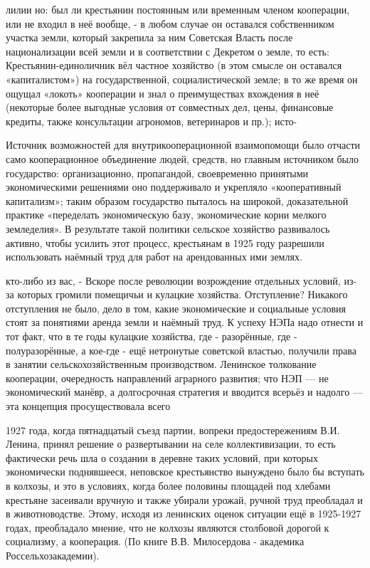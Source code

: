 \label{100-1}
лилии но: был ли крестьянин постоянным или временным членом кооперации, или не входил в неё вообще, - в любом случае он оставался собственником участка земли, который закрепила за ним Советская Власть после национализации всей земли и в соответствии с Декретом о земле, то есть: Крестьянин-единоличник вёл частное хозяйство (в этом смысле он оставался «капиталистом») на государственной, социалистической земле; в то же время он ощущал «локоть» кооперации и знал о преимуществах вхождения в неё (некоторые более выгодные условия от совместных дел, цены, финансовые кредиты, также консультации агрономов, ветеринаров и пр.); исто-

\label{101-1}
Источник возможностей для внутрикооперационной взаимопомощи было отчасти само кооперационное объединение людей, средств, но главным источником было государство: организационно, пропагандой, своевременно принятыми экономическими решениями оно поддерживало и укрепляло «кооперативный капитализм»; таким образом государство пыталось на широкой, доказательной практике «переделать экономическую базу, экономические корни мелкого земледелия». В результате такой политики сельское хозяйство развивалось активно, чтобы усилить этот процесс, крестьянам в 1925 году разрешили использовать наёмный труд для работ на арендованных ими землях.

\label{102-1}
кто-либо из вас, - Вскоре после революции возрождение отдельных условий, из-за которых громили помещичьи и кулацкие хозяйства. Отступление? Никакого отступления не было, дело в том, какие экономические и социальные условия стоят за понятиями аренда земли и наёмный труд. К успеху НЭПа надо отнести и тот факт, что в те годы кулацкие хозяйства, где - разорённые, где - полуразорённые, а кое-где - ещё нетронутые советской властью, получили права в занятии сельскохозяйственным производством. Ленинское толкование кооперации, очередность направлений аграрного развития; что НЭП — не экономический манёвр, а долгосрочная стратегия и вводится всерьёз и надолго — эта концепция просуществовала всего

\label{103-1}
1927 года, когда пятнадцатый съезд партии, вопреки предостережениям В.И. Ленина, принял решение о развертывании на селе коллективизации, то есть фактически речь шла о создании в деревне таких условий, при которых экономически поднявшееся, неповское крестьянство вынуждено было бы вступать в колхозы, и это в условиях, когда более половины площадей под хлебами крестьяне засеивали вручную и также убирали урожай, ручной труд преобладал и в животноводстве. Этому, исходя из ленинских оценок ситуации ещё в 1925-1927 годах, преобладало мнение, что не колхозы являются столбовой дорогой к социализму, а кооперация. (По книге В.В. Милосердова - академика Россельхозакадемии).

